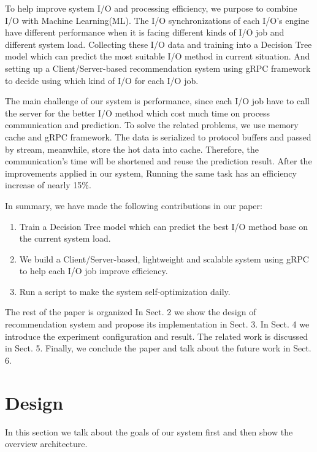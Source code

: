 \documentclass[conference]{IEEEtran}
\begin{document}
To help improve system I/O and processing efficiency, we purpose to combine I/O with Machine Learning(ML). The I/O synchronizations of each I/O's engine
have different performance when it is facing different kinds of I/O job and different system load. Collecting these I/O data and training into a Decision Tree model
which can predict the most suitable I/O method in current situation. And setting up a Client/Server-based recommendation system using gRPC framework to decide using which kind of I/O for each I/O job.


The main challenge of our system is performance, since each I/O job have to call the server for the better I/O method which cost much time on process communication and prediction.
To solve the related problems, we use memory cache and gRPC framework. The data is serialized to protocol buffers and passed by stream, meanwhile, store the hot data into cache.
Therefore, the communication's time will be shortened and reuse the prediction result. After the improvements applied in our system, Running the same task has an efficiency increase of nearly 15\%.

In summary, we have made the following contributions in our paper:
\begin{enumerate}
	\item Train a Decision Tree model which can predict the best I/O method base on the current system load.
	\item We build a Client/Server-based, lightweight and scalable system using gRPC to help each I/O job improve efficiency.
	\item Run a script to make the system self-optimization daily.
\end{enumerate}

The rest of the paper is organized In Sect. 2 we show the design
of recommendation system and propose its implementation in Sect. 3. In Sect. 4 we introduce
the experiment configuration and result. The related work is discussed in Sect.
5. Finally, we conclude the paper and talk about the future work in Sect. 6.



\section{Design}
In this section we talk about the goals of our system first and then show the overview architecture.
\end{document}

